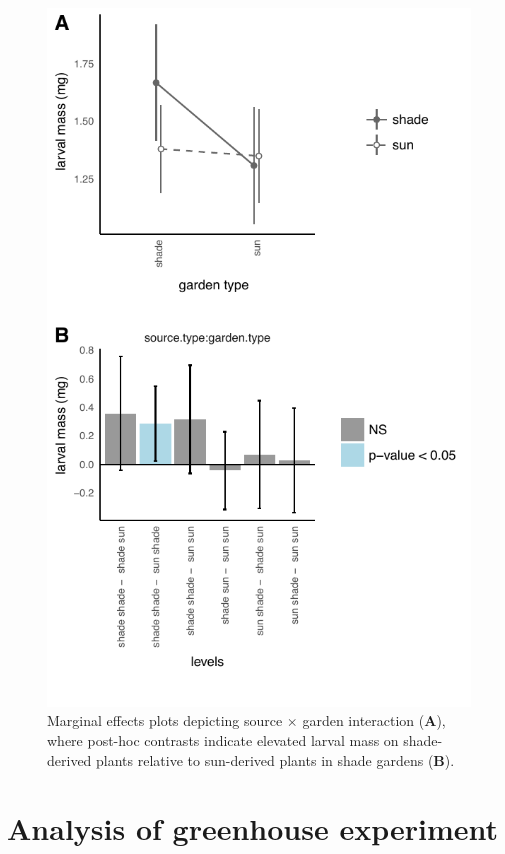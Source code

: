 \documentclass[11pt, oneside]{amsart}
\begin{document}
\begin{figure}[!htbp]
\centering
\includegraphics[scale=0.8]{larm_effects_breakdown}
\caption{Marginal effects plots depicting source $\times$ garden interaction (\textbf{A}), where post-hoc contrasts indicate elevated larval mass on shade-derived plants relative to sun-derived plants in shade gardens (\textbf{B}).}
\label{FigS11}
\end{figure}


\clearpage

\section{Analysis of greenhouse experiment}
\end{document}
